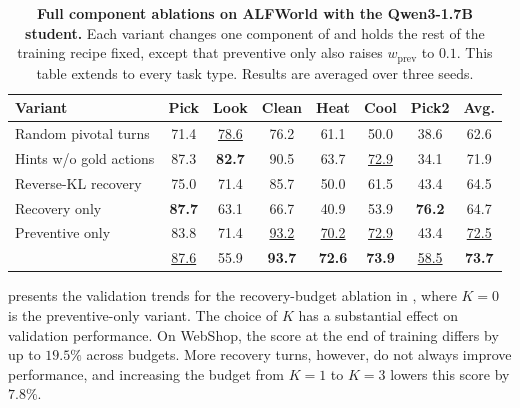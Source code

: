 \begin{table}[h]
\centering
\small
\setlength{\tabcolsep}{6pt}
\renewcommand{\arraystretch}{1.15}
\begin{tabular}{l@{\hspace{7pt}} ccccccc}
\toprule
\textbf{Variant}
& {\footnotesize Pick} & {\footnotesize Look} & {\footnotesize Clean} & {\footnotesize Heat} & {\footnotesize Cool} & {\footnotesize Pick2} & {\footnotesize\textbf{Avg.}} \\
\midrule
Random pivotal turns
 & 71.4 & \cellcolor{cellsecond}\underline{78.6} & 76.2 & 61.1 & 50.0 & 38.6 & 62.6 \\
Hints w/o gold actions
 & 87.3 & \cellcolor{cellbest}\textbf{82.7} & 90.5 & 63.7 & \cellcolor{cellsecond}\underline{72.9} & 34.1 & 71.9 \\
Reverse-KL recovery
 & 75.0 & 71.4 & 85.7 & 50.0 & 61.5 & 43.4 & 64.5 \\
Recovery only
 & \cellcolor{cellbest}\textbf{87.7} & 63.1 & 66.7 & 40.9 & 53.9 & \cellcolor{cellbest}\textbf{76.2} & 64.7 \\
Preventive only
 & 83.8 & 71.4 & \cellcolor{cellsecond}\underline{93.2} & \cellcolor{cellsecond}\underline{70.2} & \cellcolor{cellsecond}\underline{72.9} & 43.4 & \cellcolor{cellsecond}\underline{72.5} \\
\textbf{\method{}}
 & \cellcolor{cellsecond}\underline{87.6} & 55.9 & \cellcolor{cellbest}\textbf{93.7} & \cellcolor{cellbest}\textbf{72.6} & \cellcolor{cellbest}\textbf{73.9} & \cellcolor{cellsecond}\underline{58.5} & \cellcolor{cellbest}\textbf{73.7} \\
\bottomrule
\end{tabular}
\vspace{4pt}
\caption{\textbf{Full component ablations on ALFWorld with the Qwen3-1.7B student.} Each variant changes one component of \method{} and holds the rest of the training recipe fixed, except that preventive only also raises $w_\text{prev}$ to $0.1$. This table extends  to every task type. Results are averaged over three seeds.}
\label{tab:ablation_full}
\end{table}

 presents the validation trends for the recovery-budget ablation in , where $K = 0$ is the preventive-only variant. The choice of $K$ has a substantial effect on validation performance. On WebShop, the score at the end of training differs by up to $19.5\%$ across budgets. More recovery turns, however, do not always improve performance, and increasing the budget from $K = 1$ to $K = 3$ lowers this score by $7.8\%$.

